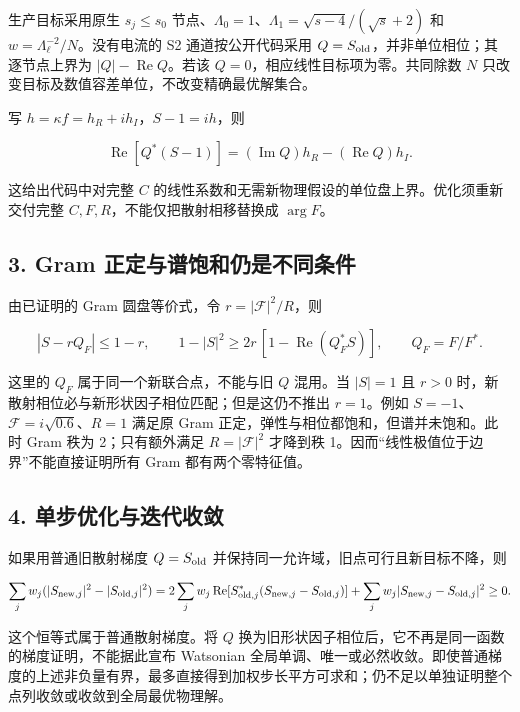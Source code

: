 \documentclass[
  10pt,
  a4paper,
]{article}
\begin{document}
生产目标采用原生 \(s_j\le s_0\)
节点、\(\Lambda_0=1\)、\(\Lambda_1=\sqrt{s-4}/(\sqrt{s}+2)\) 和
\(w=\Lambda_\ell^{-2}/N\)。没有电流的 S2 通道按公开代码采用
\(Q=S_{\rm old}\)，并非单位相位；其逐节点上界为
\(|Q|-\operatorname{Re}Q\)。若该 \(Q=0\)，相应线性目标项为零。共同除数
\(N\) 只改变目标及数值容差单位，不改变精确最优解集合。

写 \(h=\kappa f=h_R+ih_I\)，\(S-1=ih\)，则

\[
\operatorname{Re}[Q^*(S-1)]=(\operatorname{Im}Q)h_R-(\operatorname{Re}Q)h_I.
\]

这给出代码中对完整 \(C\)
的线性系数和无需新物理假设的单位盘上界。优化须重新交付完整
\(C,F,R\)，不能仅把散射相移替换成 \(\arg F\)。

\subsection{3. Gram
正定与谱饱和仍是不同条件}\label{gram-ux6b63ux5b9aux4e0eux8c31ux9971ux548cux4ecdux662fux4e0dux540cux6761ux4ef6}

由已证明的 Gram 圆盘等价式，令 \(r=|\mathcal F|^2/R\)，则

\[
|S-rQ_F|\le1-r,
\qquad
1-|S|^2\ge2r\,[1-\operatorname{Re}(Q_F^*S)],
\qquad Q_F=F/F^*.
\]

这里的 \(Q_F\) 属于同一个新联合点，不能与旧 \(Q\) 混用。当 \(|S|=1\) 且
\(r>0\) 时，新散射相位必与新形状因子相位匹配；但是这仍不推出
\(r=1\)。例如 \(S=-1\)、\(\mathcal F=i\sqrt{0.6}\)、\(R=1\) 满足原 Gram
正定，弹性与相位都饱和，但谱并未饱和。此时 Gram 秩为 2；只有额外满足
\(R=|\mathcal F|^2\) 才降到秩
1。因而``线性极值位于边界''不能直接证明所有 Gram 都有两个零特征值。

\subsection{4.
单步优化与迭代收敛}\label{ux5355ux6b65ux4f18ux5316ux4e0eux8fedux4ee3ux6536ux655b}

如果用普通旧散射梯度 \(Q=S_{\rm old}\)
并保持同一允许域，旧点可行且新目标不降，则

\[
\sum_j w_j(|S_{{\rm new},j}|^2-|S_{{\rm old},j}|^2)
=2\sum_jw_j\operatorname{Re}[S_{{\rm old},j}^*(S_{{\rm new},j}-S_{{\rm old},j})]
 +\sum_jw_j|S_{{\rm new},j}-S_{{\rm old},j}|^2\ge0.
\]

这个恒等式属于普通散射梯度。将 \(Q\)
换为旧形状因子相位后，它不再是同一函数的梯度证明，不能据此宣布 Watsonian
全局单调、唯一或必然收敛。即使普通梯度的上述非负量有界，最多直接得到加权步长平方可求和；仍不足以单独证明整个点列收敛或收敛到全局最优物理解。
\end{document}

